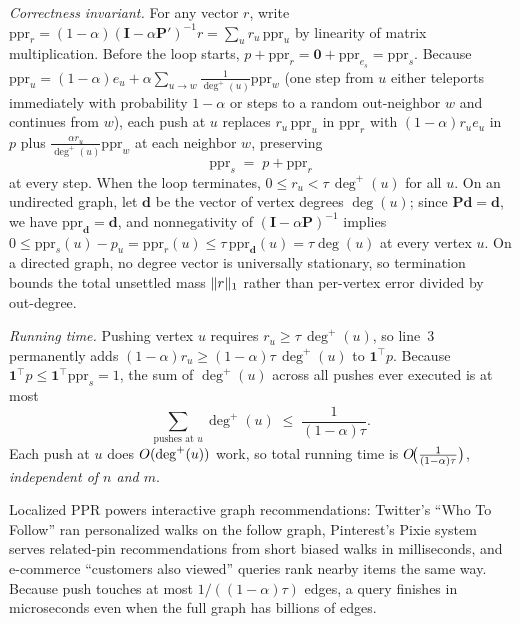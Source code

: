 \begin{whybox}
\emph{Correctness invariant.} For any vector $r$, write $\mathrm{ppr}_r = (1-\alpha)(\mathbf{I}-\alpha\mathbf{P}')^{-1}r = \sum_u r_u\,\mathrm{ppr}_u$ by linearity of matrix multiplication. Before the loop starts, $p + \mathrm{ppr}_r = \mathbf{0} + \mathrm{ppr}_{e_s} = \mathrm{ppr}_s$. Because $\mathrm{ppr}_u = (1-\alpha)e_u + \alpha \sum_{u \to w} \tfrac{1}{\deg^+(u)}\mathrm{ppr}_w$ (one step from $u$ either teleports immediately with probability $1-\alpha$ or steps to a random out-neighbor $w$ and continues from $w$), each push at $u$ replaces $r_u\,\mathrm{ppr}_u$ in $\mathrm{ppr}_r$ with $(1-\alpha)r_u e_u$ in $p$ plus $\tfrac{\alpha r_u}{\deg^+(u)}\mathrm{ppr}_w$ at each neighbor $w$, preserving
\[
  \mathrm{ppr}_s \;=\; p + \mathrm{ppr}_r
\]
at every step. When the loop terminates, $0 \le r_u < \tau\,\deg^+(u)$ for all $u$. On an undirected graph, let $\mathbf{d}$ be the vector of vertex degrees $\deg(u)$; since $\mathbf{P}\mathbf{d} = \mathbf{d}$, we have $\mathrm{ppr}_{\mathbf{d}} = \mathbf{d}$, and nonnegativity of $(\mathbf{I}-\alpha\mathbf{P})^{-1}$ implies $0 \le \mathrm{ppr}_s(u) - p_u = \mathrm{ppr}_r(u) \le \tau\,\mathrm{ppr}_{\mathbf{d}}(u) = \tau\deg(u)$ at every vertex $u$. On a directed graph, no degree vector is universally stationary, so termination bounds the total unsettled mass $\lVert r\rVert_1$ rather than per-vertex error divided by out-degree.

\emph{Running time.} Pushing vertex $u$ requires $r_u \ge \tau\,\deg^+(u)$, so line~3 permanently adds $(1-\alpha)r_u \ge (1-\alpha)\tau\,\deg^+(u)$ to $\mathbf{1}^\top p$. Because $\mathbf{1}^\top p \le \mathbf{1}^\top \mathrm{ppr}_s = 1$, the sum of $\deg^+(u)$ across all pushes ever executed is at most
\[
  \sum_{\text{pushes at } u} \deg^+(u) \;\le\; \frac{1}{(1-\alpha)\tau}.
\]
Each push at $u$ does $O(\deg^+(u))$ work, so total running time is $O\!\big(\tfrac{1}{(1-\alpha)\tau}\big)$, \emph{independent of $n$ and $m$}.
\end{whybox}

\begin{applicationbox}
Localized PPR powers interactive graph recommendations: Twitter's ``Who To Follow'' ran personalized walks on the follow graph, Pinterest's Pixie system serves related-pin recommendations from short biased walks in milliseconds, and e-commerce ``customers also viewed'' queries rank nearby items the same way. Because push touches at most $1/((1-\alpha)\tau)$ edges, a query finishes in microseconds even when the full graph has billions of edges.
\end{applicationbox}

